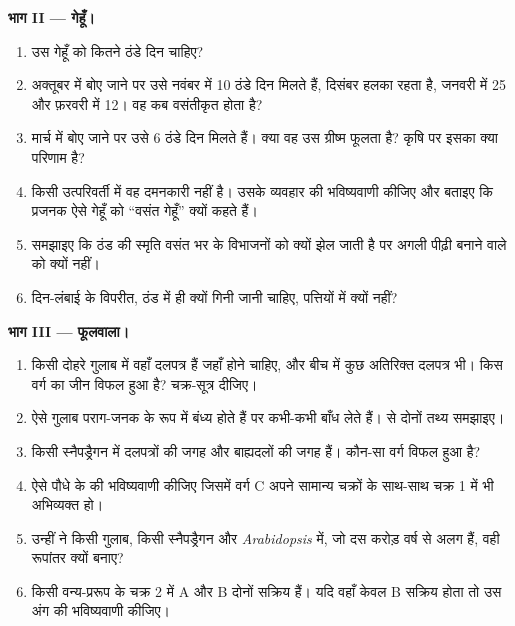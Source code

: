 \begin{problem}
\medskip
\noindent\textbf{भाग II --- गेहूँ।}
\begin{enumerate}[resume]
  \item उस गेहूँ को कितने ठंडे दिन चाहिए?
  \item अक्तूबर में बोए जाने पर उसे नवंबर में 10 ठंडे दिन मिलते हैं,
        दिसंबर हलका रहता है, जनवरी में 25 और फ़रवरी में 12। वह कब
        वसंतीकृत होता है?
  \item मार्च में बोए जाने पर उसे 6 ठंडे दिन मिलते हैं। क्या वह उस
        ग्रीष्म फूलता है? कृषि पर इसका क्या परिणाम है?
  \item किसी उत्परिवर्ती में वह दमनकारी नहीं है। उसके व्यवहार की
        भविष्यवाणी कीजिए और बताइए कि प्रजनक ऐसे गेहूँ को ``वसंत गेहूँ'' क्यों कहते हैं।
  \item समझाइए कि ठंड की स्मृति वसंत भर  के विभाजनों को क्यों
        झेल जाती है पर अगली पीढ़ी बनाने वाले  को क्यों
        नहीं।
  \item दिन-लंबाई के विपरीत, ठंड  में ही क्यों गिनी जानी
        चाहिए, पत्तियों में क्यों नहीं?
\end{enumerate}

\medskip
\noindent\textbf{भाग III --- फूलवाला।}
\begin{enumerate}[resume]
  \item किसी दोहरे गुलाब में वहाँ दलपत्र हैं जहाँ  होने चाहिए,
        और बीच में कुछ अतिरिक्त दलपत्र भी। किस वर्ग का जीन विफल हुआ
        है? चक्र-सूत्र दीजिए।
  \item ऐसे गुलाब पराग-जनक के रूप में बंध्य होते हैं पर कभी-कभी
         बाँध लेते हैं।  से दोनों तथ्य समझाइए।
  \item किसी स्नैपड्रैगन में दलपत्रों की जगह  और बाह्यदलों की
        जगह  हैं। कौन-सा वर्ग विफल हुआ है?
  \item ऐसे पौधे के  की भविष्यवाणी कीजिए जिसमें वर्ग C अपने
        सामान्य चक्रों के साथ-साथ चक्र 1 में भी अभिव्यक्त हो।
  \item उन्हीं  ने किसी गुलाब, किसी स्नैपड्रैगन और
        \emph{Arabidopsis} में, जो दस करोड़ वर्ष से अलग हैं, वही
        रूपांतर क्यों बनाए?
  \item किसी वन्य-प्ररूप  के चक्र 2 में A और B दोनों सक्रिय हैं।
        यदि वहाँ केवल B सक्रिय होता तो उस अंग की भविष्यवाणी कीजिए।
\end{enumerate}


\end{problem}
